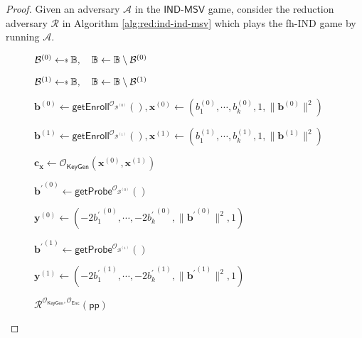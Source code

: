 \begin{proof}

Given an adversary $\mathcal{A}$ in the $\textsf{IND-MSV}$ game, consider the reduction adversary $\mathcal{R}$ in Algorithm \ref{alg:red:ind-ind-msv} which plays the \textsf{fh-IND} game by running $\mathcal{A}$.

\begin{figure}[h]
\centering
	
	\begin{minipage}[t]{0.75\linewidth}
	\centering
	\begin{algorithm}[H]
	\caption{$\mathcal{R}^{\mathcal{O}_{\textsf{KeyGen}}, \mathcal{O}_{\textsf{Enc}}}(\textsf{pp})$}
	\label{alg:red:ind-ind-msv}
	\begin{algorithmic}[1]
		\State $\mathcal{B}^{(0)} \getsdollar \mathbb{B}, \quad \mathbb{B} \gets \mathbb{B} \setminus \mathcal{B}^{(0)}$ \label{alg:red:ind-ind-msv:B0}
		
		\State $\mathcal{B}^{(1)} \getsdollar \mathbb{B}, \quad \mathbb{B} \gets \mathbb{B} \setminus \mathcal{B}^{(1)}$ \label{alg:red:ind-ind-msv:B1}

		\State $\mathbf{b}^{(0)} \gets \textsf{getEnroll}^{\mathcal{O}_{\mathcal{B}^{(0)}}}(), \mathbf{x}^{(0)} \gets (b_1^{(0)}, \cdots, b_k^{(0)}, 1, \|\mathbf{b}^{(0)}\|^2)$
		
		\State $\mathbf{b}^{(1)} \gets \textsf{getEnroll}^{\mathcal{O}_{\mathcal{B}^{(1)}}}(), \mathbf{x}^{(1)} \gets (b_1^{(1)}, \cdots, b_k^{(1)}, 1, \|\mathbf{b}^{(1)}\|^2)$
		
		\State $\mathbf{c_x} \gets \mathcal{O}_{\textsf{KeyGen}}(\mathbf{x}^{(0)}, \mathbf{x}^{(1)})$ \label{alg:red:ind-ind-msv:cx}

			
			\State ${\mathbf{b}^\prime}^{(0)} \gets \textsf{getProbe}^{\mathcal{O}_{\mathcal{B}^{(0)}}}()$

			\State $\mathbf{y}^{(0)} \gets (-2{b_1^\prime}^{(0)}, \cdots, -2{b_k^\prime}^{(0)}, \| {\mathbf{b}^\prime}^{(0)} \|^2, 1) $

			\Repeat 
				
				\State ${\mathbf{b}^\prime}^{(1)} \gets \textsf{getProbe}^{\mathcal{O}_{\mathcal{B}^{(1)}}}()$

				\State $\mathbf{y}^{(1)} \gets (-2{b_1^\prime}^{(1)}, \cdots, -2{b_k^\prime}^{(1)}, \| {\mathbf{b}^\prime}^{(1)} \|^2, 1)$

			 \label{alg:red:ind-ind-msv:while}


\end{algorithmic}
\end{algorithm}
\end{minipage}
\end{figure}
\end{proof}
